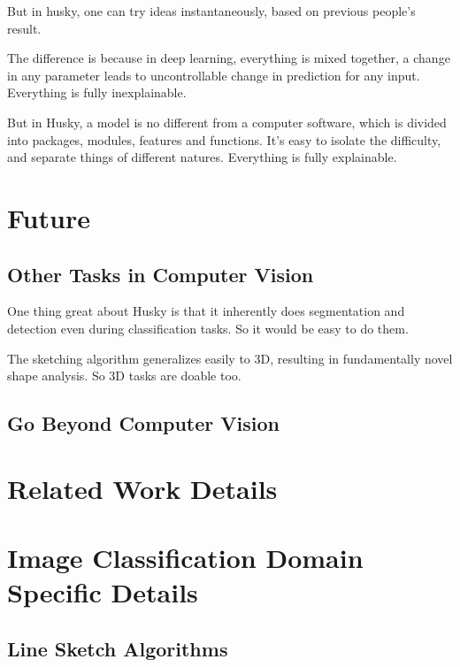 \documentclass[11pt]{article} 	%
\theoremstyle{definition}
\begin{document}
But in husky, one can try ideas instantaneously, based on previous people's result.

The difference is because in deep learning, everything is mixed together, a change in any parameter leads to uncontrollable change in prediction for any input. Everything is fully inexplainable.

But in Husky, a model is no different from a computer software, which is divided into packages, modules, features and functions. It's easy to isolate the difficulty, and separate things of different natures. Everything is fully explainable.

\subsection{}


\section{Future}

\subsection{Other Tasks in Computer Vision}

One thing great about Husky is that it inherently does segmentation and detection even during classification tasks. So it would be easy to do them.

The sketching algorithm generalizes easily to 3D, resulting in fundamentally novel shape analysis. So 3D tasks are doable too.

\subsection{Go Beyond Computer Vision}

\appendix

\section{Related Work Details}

\section{Image Classification Domain Specific Details}

\subsection{Line Sketch Algorithms}
\end{document}
